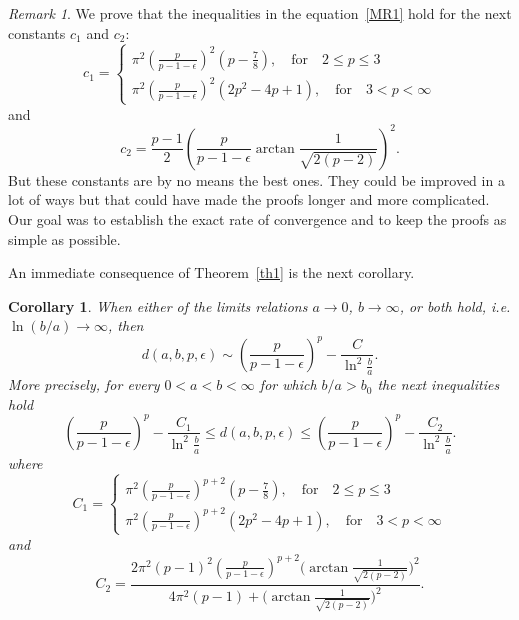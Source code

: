 \documentclass{amsart}
\newtheorem{cor}[theorem]{Corollary}
\theoremstyle{definition}
\theoremstyle{remark}
\newtheorem{remark}[theorem]{Remark}
\numberwithin{equation}{section}
\begin{document}
\begin{remark}
We prove that the inequalities in the equation~\ref{MR1} hold for the next constants $c_1$ and $c_2$:
\begin{equation*}\label{c1}
  c_1=
    \begin{cases}
          \pi^2\left(\frac{p}{p-1-\epsilon} \right)^2 \left(p-\frac{7}{8}\right), \quad\mbox{for}\quad 2\le p\le3\\
        \pi^2\left(\frac{p}{p-1-\epsilon} \right)^2   \left(2p^2-4p+1\right), \quad\mbox{for}\quad 3<p< \infty
        \end{cases}
 \end{equation*} 
 and
\begin{equation*}\label{c2}
c_2 =  \frac{p-1}{2}\left(\frac{p}{p-1-\epsilon}\arctan{\frac{1}{\sqrt{2(p-2)}}}\right)^2.
 \end{equation*} 
But these constants %
  are by no means the best ones. %
     They could be improved in a lot of ways but that could have made the proofs longer and more complicated.
Our goal was to establish the exact rate of convergence and to keep the proofs as simple as possible. 
\end{remark}
An immediate consequence of Theorem~\ref{th1} is the next corollary. 
\begin{cor}\label{cor1}
 When either of the limits relations $a\rightarrow0$,  $b\rightarrow\infty$, or both hold, i.e. $\ln(b/a)\rightarrow\infty$, then
\[
d(a,b,p,\epsilon) \sim 
\left(\frac{p}{p-1-\epsilon} \right)^p -\frac{C}{\ln^2 \frac{b}{a}}.
\]
More precisely, for every $0<a<b<\infty$ for which $b/a>b_0$ the next inequalities hold 
\begin{equation*}
\left(\frac{p}{p-1-\epsilon} \right)^p -\frac{C_1}{\ln^2 \frac{b}{a}} \le d(a,b,p,\epsilon) \le 
\left(\frac{p}{p-1-\epsilon} \right)^p -\frac{C_2}{\ln^2 \frac{b}{a}}.
\end{equation*}
where
\begin{equation*}
  C_1= 
    \begin{cases}
          \pi^2\left(\frac{p}{p-1-\epsilon} \right)^{p+2} \left(p-\frac{7}{8}\right), \quad\mbox{for}\quad 2\le p\le3\\
        \pi^2\left(\frac{p}{p-1-\epsilon} \right)^{p+2}  \left(2p^2-4p+1\right), \quad\mbox{for}\quad 3<p< \infty
        \end{cases}
 \end{equation*}
 and
\[
C_2 = \frac{2\pi^2(p-1)^2 \left(\frac{p}{p-1-\epsilon}\right)^{p+2}
\Big( \arctan{\frac{1}{\sqrt{2(p-2)}} }\Big)^2}{4\pi^2(p-1)+\Big( \arctan{\frac{1}{\sqrt{2(p-2)}} }\Big)^2}.
\]
\end{cor}
\end{document}
